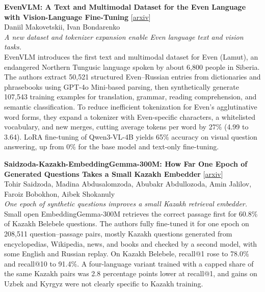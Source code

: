 \documentclass[12pt,letterpaper]{article}
\begin{document}
\medskip
\begin{minipage}{\linewidth}
{\small\textbf{EvenVLM: A Text and Multimodal Dataset for the Even Language with Vision-Language Fine-Tuning}} {\scriptsize[\href{https://arxiv.org/abs/2611.16500}{arxiv}]}\\
{\scriptsize Daniil Makovetskii, Ivan Bondarenko}\\
{\footnotesize\textit{A new dataset and tokenizer expansion enable Even language text and vision tasks.}}\\[2pt]
{\footnotesize EvenVLM introduces the first text and multimodal dataset for Even (Lamut), an endangered Northern Tungusic language spoken by about 6,800 people in Siberia. The authors extract 50,521 structured Even--Russian entries from dictionaries and phrasebooks using GPT-4o Mini-based parsing, then synthetically generate 107,543 training examples for translation, grammar, reading comprehension, and semantic classification. To reduce inefficient tokenization for Even's agglutinative word forms, they expand a tokenizer with Even-specific characters, a whitelisted vocabulary, and new merges, cutting average tokens per word by 27\% (4.99 to 3.64). LoRA fine-tuning of Qwen3-VL-4B yields 65\% accuracy on visual question answering, up from 0\% for the base model and text-only fine-tuning.}
\end{minipage}

\medskip
\begin{minipage}{\linewidth}
{\small\textbf{Saidzoda-Kazakh-EmbeddingGemma-300M: How Far One Epoch of Generated Questions Takes a Small Kazakh Embedder}} {\scriptsize[\href{https://arxiv.org/abs/2611.16399}{arxiv}]}\\
{\scriptsize Tohir Saidzoda, Madina Abdusalomzoda, Abubakr Abdullozoda, Amin Jalilov, Faroiz Bobokhon, Aibek Shokanuly}\\
{\footnotesize\textit{One epoch of synthetic questions improves a small Kazakh retrieval embedder.}}\\[2pt]
{\footnotesize Small open EmbeddingGemma-300M retrieves the correct passage first for 60.8\% of Kazakh Belebele questions. The authors fully fine-tuned it for one epoch on 208,511 question--passage pairs, mostly Kazakh questions generated from encyclopedias, Wikipedia, news, and books and checked by a second model, with some English and Russian replay. On Kazakh Belebele, recall@1 rose to 78.0\% and recall@10 to 91.4\%. A four-language variant trained with a capped share of the same Kazakh pairs was 2.8 percentage points lower at recall@1, and gains on Uzbek and Kyrgyz were not clearly specific to Kazakh training.}
\end{minipage}
\end{document}
